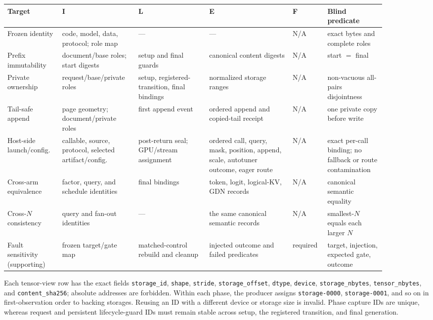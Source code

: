 \documentclass{article}
\begin{document}
\begin{center}
\scriptsize
\setlength{\tabcolsep}{2.5pt}
\begin{tabular}{@{}p{0.13\linewidth}p{0.17\linewidth}p{0.17\linewidth}p{0.20\linewidth}p{0.08\linewidth}p{0.14\linewidth}@{}}
\toprule
Target & I & L & E & F & Blind predicate \\
\midrule
Frozen identity & code, model, data, protocol; role map & --- & --- & N/A & exact bytes and complete roles \\
Prefix immutability & document/base roles; start digests & setup and final guards & canonical content digests & N/A & start $=$ final \\
Private ownership & request/base/private roles & setup, registered-transition, final bindings & normalized storage ranges & N/A & non-vacuous all-pairs disjointness \\
Tail-safe append & page geometry; document/private roles & first append event & ordered append and copied-tail receipt & N/A & one private copy before write \\
Host-side launch/config. & callable, source, protocol, selected artifact/config. & post-return seal; GPU/stream assignment & ordered call, query, mask, position, append, scale, autotuner outcome, eager route & N/A & exact per-call binding; no fallback or route contamination \\
Cross-arm equivalence & factor, query, and schedule identities & final bindings & token, logit, logical-KV, GDN records & N/A & canonical semantic equality \\
Cross-$N$ consistency & query and fan-out identities & --- & the same canonical semantic records & N/A & smallest-$N$ equals each larger $N$ \\
Fault sensitivity (supporting) & frozen target/gate map & matched-control rebuild and cleanup & injected outcome and failed predicates & required & target, injection, expected gate, outcome \\
\bottomrule
\end{tabular}
\end{center}

Each tensor-view row has the exact fields
\texttt{storage\_id}, \texttt{shape}, \texttt{stride},
\texttt{storage\_offset}, \texttt{dtype}, \texttt{device},
\texttt{storage\_nbytes}, \texttt{tensor\_nbytes}, and
\texttt{content\_sha256}; absolute addresses are forbidden.  Within each
phase, the producer assigns \texttt{storage-0000}, \texttt{storage-0001},
and so on in first-observation order to backing storages.  Reusing an ID with
a different device or storage size is invalid.  Phase capture IDs are unique,
whereas request and persistent lifecycle-guard IDs must remain stable across
setup, the registered transition, and final generation.
\end{document}
